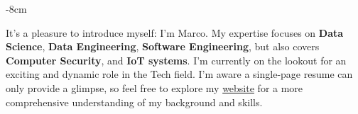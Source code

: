 \documentclass[10pt,a4paper]{altacv}
\begin{document}







\begin{adjustwidth}{}{-8cm}
\makecvheader
\end{adjustwidth}

It's a pleasure to introduce myself: I'm Marco. My expertise focuses on \textbf{Data Science}, \textbf{Data Engineering}, \textbf{Software Engineering}, but also covers \textbf{Computer Security}, and \textbf{IoT systems}. I'm currently on the lookout for an exciting and dynamic role in the Tech field. I'm aware a single-page resume can only provide a glimpse, so feel free to explore my \href{https://mmarini.it}{website} for a more comprehensive understanding of my background and skills.



\end{document}
